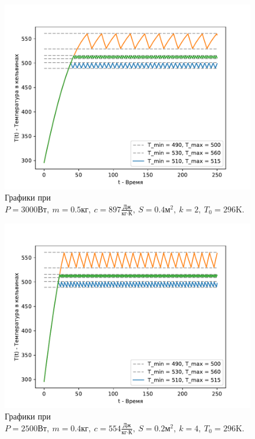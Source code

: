         \begin{figure}[H]
            \centering
            \includegraphics[width=11cm]{pictures/utug2.pdf}
            \caption{Графики при $P = 3000 \text{Вт}, ~ m = 0.5 \text{кг}, ~ c = 897 \frac{\text{Дж}}{\text{кг} \cdot \text{К}}, ~ S = 0.4 \text{м}^2, ~ k = 2, ~ T_0 = 296 \text{K}$.}
        \end{figure}


        \begin{figure}[H]
            \centering
            \includegraphics[width=11cm]{pictures/utug3.pdf}
            \caption{Графики при $P = 2500 \text{Вт}, ~ m = 0.4 \text{кг}, ~ c = 554 \frac{\text{Дж}}{\text{кг} \cdot \text{К}}, ~ S = 0.2 \text{м}^2, ~ k = 4, ~ T_0 = 296 \text{K}$.}
        \end{figure}


